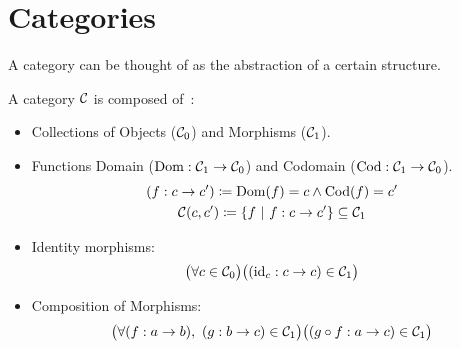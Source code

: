\section{Categories}
A category can be thought of as the abstraction of a certain structure.

\begin{definition}
  A category $\mathcal{C}$ is composed of~\parencite[p.~4]{awodey:category_theory}:
  \begin{itemize}
    \item Collections of Objects ($\mathcal{C}_0$) and Morphisms ($\mathcal{C}_1$).
    \item Functions Domain ($\mathrm{Dom}:\mathcal{C}_1\to \mathcal{C}_0$) and Codomain
      ($\mathrm{Cod}: \mathcal{C}_1 \to \mathcal{C}_0$).
      \[
        \begin{gathered}
          (f : c\to c')
          \coloneqq \mathrm{Dom}(f) = c \land \mathrm{Cod}(f) = c'\\
          \mathcal{C}(c, c') \coloneqq \{f\ |\ f : c \to c'\}\subseteq \mathcal{C}_1
        \end{gathered}
      \]
    \item Identity morphisms:
      \[\big(\forall c \in \mathcal{C}_0\big)
        \big((\mathrm{id}_c : c\to c)\in \mathcal{C}_1\big)\]
    \item Composition of Morphisms:
      \[\big(\forall (f :a \to b),\ (g : b\to c) \in \mathcal{C}_1\big)
        \big((g\circ f :a\to c) \in \mathcal{C}_1\big)\]
  \end{itemize}


\end{definition}
